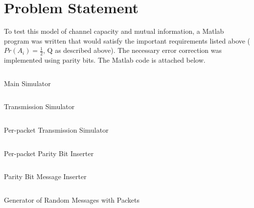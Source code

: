 \documentclass{article}
\begin{document}
   \section{Problem Statement}
      To test this model of channel capacity and mutual information,
      a Matlab program was written that would satisfy the important
      requirements listed above ($Pr(A_i) = \frac{1}{2}$, Q as described above).
      The necessary error correction was implemented using parity bits.
      The Matlab code is attached below.

      \begin{listing}[H]
         \inputminted[linenos]{matlab}{../main.m}
         \caption{Main Simulator}
      \end{listing}
      
      \begin{listing}[H]
         \inputminted[linenos]{matlab}{../transmit.m}
         \caption{Transmission Simulator}
      \end{listing}

      \begin{listing}[H]
         \inputminted[linenos]{matlab}{../transmit_msg.m}
         \caption{Per-packet Transmission Simulator}
      \end{listing}

      \begin{listing}[H]
         \inputminted[linenos]{matlab}{../insert_parity_bit.m}
         \caption{Per-packet Parity Bit Inserter}
      \end{listing}

      \begin{listing}[H]
         \inputminted[linenos]{matlab}{../parity.m}
         \caption{Parity Bit Message Inserter}
      \end{listing}

      \begin{listing}[H]
         \inputminted[linenos]{matlab}{../generate_random_msg.m}
         \caption{Generator of Random Messages with Packets}
      \end{listing}
\end{document}
